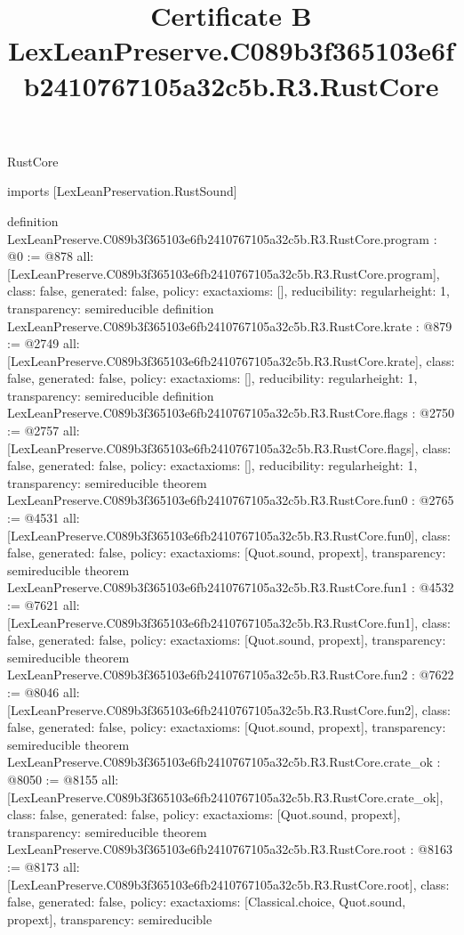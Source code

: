 \begin{lexlean}{RustCore}
\title{Certificate B LexLeanPreserve.C089b3f365103e6fb2410767105a32c5b.R3.RustCore}
\begin{coremodule}
imports [LexLeanPreservation.RustSound]

definition LexLeanPreserve.C089b3f365103e6fb2410767105a32c5b.R3.RustCore.program : @0 := @878 {
  all: [LexLeanPreserve.C089b3f365103e6fb2410767105a32c5b.R3.RustCore.program],
  class: false,
  generated: false,
  policy: exact{axioms: []},
  reducibility: regular{height: 1},
  transparency: semireducible
}
definition LexLeanPreserve.C089b3f365103e6fb2410767105a32c5b.R3.RustCore.krate : @879 := @2749 {
  all: [LexLeanPreserve.C089b3f365103e6fb2410767105a32c5b.R3.RustCore.krate],
  class: false,
  generated: false,
  policy: exact{axioms: []},
  reducibility: regular{height: 1},
  transparency: semireducible
}
definition LexLeanPreserve.C089b3f365103e6fb2410767105a32c5b.R3.RustCore.flags : @2750 := @2757 {
  all: [LexLeanPreserve.C089b3f365103e6fb2410767105a32c5b.R3.RustCore.flags],
  class: false,
  generated: false,
  policy: exact{axioms: []},
  reducibility: regular{height: 1},
  transparency: semireducible
}
theorem LexLeanPreserve.C089b3f365103e6fb2410767105a32c5b.R3.RustCore.fun0 : @2765 := @4531 {
  all: [LexLeanPreserve.C089b3f365103e6fb2410767105a32c5b.R3.RustCore.fun0],
  class: false,
  generated: false,
  policy: exact{axioms: [Quot.sound, propext]},
  transparency: semireducible
}
theorem LexLeanPreserve.C089b3f365103e6fb2410767105a32c5b.R3.RustCore.fun1 : @4532 := @7621 {
  all: [LexLeanPreserve.C089b3f365103e6fb2410767105a32c5b.R3.RustCore.fun1],
  class: false,
  generated: false,
  policy: exact{axioms: [Quot.sound, propext]},
  transparency: semireducible
}
theorem LexLeanPreserve.C089b3f365103e6fb2410767105a32c5b.R3.RustCore.fun2 : @7622 := @8046 {
  all: [LexLeanPreserve.C089b3f365103e6fb2410767105a32c5b.R3.RustCore.fun2],
  class: false,
  generated: false,
  policy: exact{axioms: [Quot.sound, propext]},
  transparency: semireducible
}
theorem LexLeanPreserve.C089b3f365103e6fb2410767105a32c5b.R3.RustCore.crate_ok : @8050 := @8155 {
  all: [LexLeanPreserve.C089b3f365103e6fb2410767105a32c5b.R3.RustCore.crate_ok],
  class: false,
  generated: false,
  policy: exact{axioms: [Quot.sound, propext]},
  transparency: semireducible
}
theorem LexLeanPreserve.C089b3f365103e6fb2410767105a32c5b.R3.RustCore.root : @8163 := @8173 {
  all: [LexLeanPreserve.C089b3f365103e6fb2410767105a32c5b.R3.RustCore.root],
  class: false,
  generated: false,
  policy: exact{axioms: [Classical.choice, Quot.sound, propext]},
  transparency: semireducible
}


\end{coremodule}
\end{lexlean}
